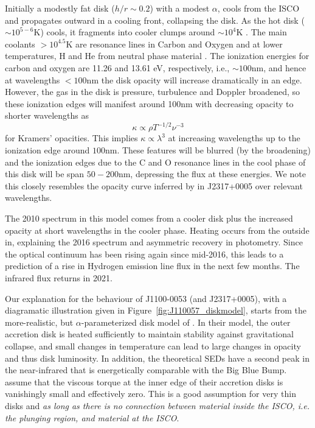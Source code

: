 \documentclass[a4paper,fleqn,usenatbib]{mnras}
\begin{document}
Initially a modestly fat disk ($h/r \sim 0.2$) with a modest $\alpha$,
cools from the ISCO and propagates outward in a cooling front,
collapsing the disk. As the hot disk ($\sim 10^{5-6}$K) cools, it
fragments into cooler clumps around $\sim 10^{4}$K \citep[see e.g.,
][]{McCourt2016}.  The main coolants $>10^{4.5}$K are resonance lines
in Carbon and Oxygen and at lower temperatures, H and He from neutral
phase material \citep[see e.g., Fig. 18 in
][]{Sutherland_Dopita1993}. The ionization energies for carbon and
oxygen are 11.26 and 13.61 eV, respectively, i.e., $\sim 100$nm, and
hence at wavelengths $<100$nm the disk opacity will increase
dramatically in an edge.  However, the gas in the disk is pressure,
turbulence and Doppler broadened, so these ionization edges will
manifest around 100nm with decreasing opacity to shorter wavelengths
as
\begin{equation}
  \kappa \propto \rho T^{-1/2} \nu^{-3}
\end{equation}
for Kramers' opacities. This implies $\kappa \propto \lambda^{3}$
at increasing wavelengths up to the ionization edge around $100$nm.
These features will be blurred (by the broadening) and the ionization 
edges due to the C and O resonance lines in the cool phase of this
disk will be span $50-200$nm, depressing the flux at these energies. 
We note this closely resembles the opacity curve inferred by \citet{Guo2016} 
in J2317+0005 over relevant wavelengths.

The 2010 spectrum in this model comes from a cooler disk plus the
increased opacity at short wavelengths in the cooler phase. Heating
occurs from the outside in, explaining the 2016 spectrum and
asymmetric recovery in photometry.  Since the
optical continuum has been rising again since mid-2016, this leads to
a prediction of a rise in Hydrogen emission line flux in the next few
months. The infrared flux returns in 2021. 

Our explanation for the behaviour of J1100-0053 (and J2317+0005), with
a diagramatic illustration given in
Figure~\ref{fig:J110057_diskmodel}, starts from the more-realistic,
but $\alpha$-parameterized disk model of \citet{Sirko_Goodman2003}. In
their model, the outer accretion disk is heated sufficiently to
maintain stability against gravitational collapse, and small changes
in temperature can lead to large changes in opacity and thus disk
luminosity. In addition, the theoretical SEDs have a second peak in
the near-infrared that is energetically comparable with the Big Blue
Bump. \citet{Sirko_Goodman2003} assume that the viscous torque at the
inner edge of their accretion disks is vanishingly small and
effectively zero. This is a good assumption for very thin disks and
\emph{as long as there is no connection between material inside the
ISCO, i.e. the plunging region, and material at the ISCO}.
\end{document}
